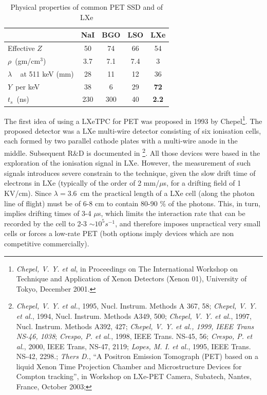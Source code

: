 \begin{table}[htdp!]
\caption{Physical properties of common PET SSD and of LXe}
\begin{center}
\begin{tabular}{|l||c|c|c|c|}
\hline
& NaI & BGO & LSO & LXe\\
\hline
Effective $Z$ & 50 & 74 & 66 & 54 \\
$\rho$~(gm/cm$^3$) & 3.7 & 7.1 & 7.4 &  3 \\
$\lambda$ ~ at 511 keV (mm) & 28 & 11 & 12 & 36 \\
$Y$~per keV & 38 & 6 & 29 & {\bf 72} \\
$t_s$~(ns) & 230 & 300 & 40 & {\bf 2.2} \\
\hline
\end{tabular}
\end{center}
\label{table.SDPP}
\end{table}%

The first idea of using a LXeTPC for PET was proposed in 1993 by Chepel\footnote{{\em Chepel, V. Y. et al}, in Proceedings on The International
Workshop on Technique and Application of Xenon Detectors (Xenon 01), University of Tokyo, December 2001.}. The proposed detector was a LXe multi-wire detector consisting of six ionisation cells, each formed by two parallel cathode plates with a multi-wire anode in the middle. 
Subsequent R\&D is documented in \footnote{{\em Chepel, V. Y. et al.}, 1995, Nucl. Instrum. Methods A
367, 58; {\em Chepel, V. Y. et al.}, 1994, Nucl. Instrum. Methods
A349, 500; {\em Chepel, V. Y. et al.}, 1997, Nucl. Instrum. Methods A392, 427; {\em Chepel, V. Y. et al., 1999, IEEE Trans NS-46, 1038}; {\em Crespo, P. et al.}, 1998, IEEE Trans. NS-45, 56; {\em Crespo, P. et al.}, 2000, IEEE Trans, NS-47, 2119; {\em Lopes, M. I. et al.}, 1995, IEEE Trans. NS-42, 2298.; {\em Thers D.}, ``A Positron Emission Tomograph (PET)
based on a liquid Xenon Time Projection Chamber and Microstructure Devices for Compton tracking'', in Workshop on LXe-PET Camera, Subatech, Nantes, France, October 2003; }. All those devices were based in the exploration of the ionisation signal in LXe. However, the measurement of such signals introduces severe constrain to the technique, given the slow drift time of electrons in LXe (typically of the order of 2 mm/$\mu$s, for a drifting field of 
1 KV/cm). Since $\lambda = 3.6$~cm the practical length of a LXe cell (along the photon line of flight) must be of 6-8 cm to contain 80-90 \% of the photons. This, in turn, implies drifting times of 3-4 $\mu$s, which limits the interaction rate that can be recorded by the cell to  
2-3 $\sim10^5 s^{-1}$, and therefore imposes unpractical very small cells or forces a low-rate PET (both options imply devices which are non competitive commercially). 

